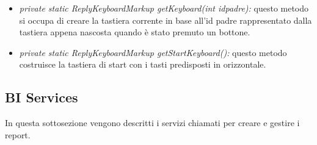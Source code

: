 \begin{itemize}
\item \textit{private static ReplyKeyboardMarkup getKeyboard(int idpadre):}
questo metodo si occupa di creare la tastiera corrente in base all'id padre rappresentato dalla tastiera appena nascosta quando è stato premuto un bottone. 

\item \textit{private static ReplyKeyboardMarkup getStartKeyboard():}
questo metodo costruisce la tastiera di start con i tasti predisposti in orizzontale.

\end{itemize}

\subsection{BI Services}

In questa sottosezione vengono descritti i servizi chiamati per creare e gestire i report. \\

